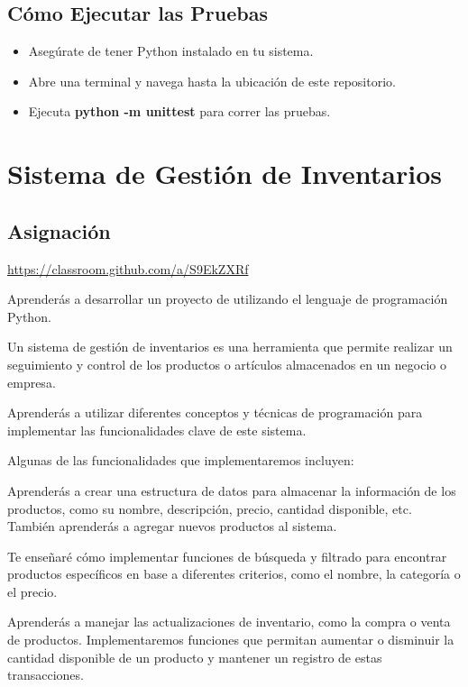 \documentclass[
  a4paper,
  DIV=11,
  numbers=noendperiod,
  onepage,
  openany]{scrreprt}
\providecommand{\tightlist}{%
  \setlength{\itemsep}{0pt}\setlength{\parskip}{0pt}}\usepackage{longtable,booktabs,array}
\begin{document}
\section{Cómo Ejecutar las
Pruebas}\label{cuxf3mo-ejecutar-las-pruebas-1}

\begin{itemize}
\tightlist
\item
  Asegúrate de tener Python instalado en tu sistema.
\item
  Abre una terminal y navega hasta la ubicación de este repositorio.
\item
  Ejecuta \textbf{python -m unittest} para correr las pruebas.
\end{itemize}

\chapter{Sistema de Gestión de
Inventarios}\label{sistema-de-gestiuxf3n-de-inventarios}

\section{Asignación}\label{asignaciuxf3n-5}

\url{https://classroom.github.com/a/S9EkZXRf}

Aprenderás a desarrollar un proyecto de utilizando el lenguaje de
programación Python.

Un sistema de gestión de inventarios es una herramienta que permite
realizar un seguimiento y control de los productos o artículos
almacenados en un negocio o empresa.

Aprenderás a utilizar diferentes conceptos y técnicas de programación
para implementar las funcionalidades clave de este sistema.

Algunas de las funcionalidades que implementaremos incluyen:

Aprenderás a crear una estructura de datos para almacenar la información
de los productos, como su nombre, descripción, precio, cantidad
disponible, etc. También aprenderás a agregar nuevos productos al
sistema.

Te enseñaré cómo implementar funciones de búsqueda y filtrado para
encontrar productos específicos en base a diferentes criterios, como el
nombre, la categoría o el precio.

Aprenderás a manejar las actualizaciones de inventario, como la compra o
venta de productos. Implementaremos funciones que permitan aumentar o
disminuir la cantidad disponible de un producto y mantener un registro
de estas transacciones.
\end{document}
